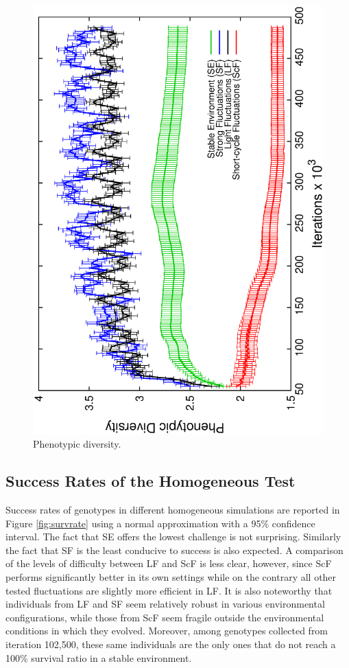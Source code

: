 \begin{figure}[h]
\centering
\includegraphics[width=0.7\columnwidth, angle=-90]{img/PhenoDiv}
\caption{Phenotypic diversity.}
\label{fig:phenodiv}
\end{figure}

\subsection{Success Rates of the Homogeneous Test}



Success rates of genotypes in different homogeneous simulations are reported in Figure \ref{fig:survrate} using a normal approximation with a 95\% confidence interval. The fact that SE offers the lowest challenge is not surprising. Similarly the fact that SF is the least conducive to success is also expected. A comparison of the levels of difficulty between LF and ScF is less clear, however, since ScF performs significantly better in its own settings while on the contrary all other tested fluctuations are slightly more efficient in LF. It is also noteworthy that individuals from LF and SF seem relatively robust in various environmental configurations, while those from ScF seem fragile outside the environmental conditions in which they evolved. Moreover, among genotypes collected from iteration 102,500, these same individuals are the only ones that do not reach a 100\% survival ratio in a stable environment.

